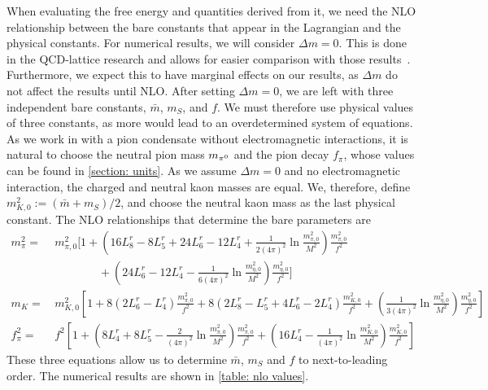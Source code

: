  When evaluating the free energy and quantities derived from it, we need the NLO relationship between the bare constants that appear in the Lagrangian and the physical constants.
For numerical results, we will consider $\Delta m = 0$.
This is done in the QCD-lattice research and allows for easier comparison with those results~\autocite{brandtNewClassCompact2018}.
Furthermore, we expect this to have marginal effects on our results, as $\Delta m$ do not affect the results until NLO.
After setting $\Delta m = 0$, we are left with three independent bare constants, $\bar m$, $m_S$, and $f$.
We must therefore use physical values of three constants, as more would lead to an overdetermined system of equations.
As we work in with a pion condensate without electromagnetic interactions, it is natural to choose the neutral pion mass $m_{\pi^0}$ and the pion decay $f_\pi$, whose values can be found in \autoref{section: units}.
As we assume $\Delta m = 0$ and no electromagnetic interaction, the charged and neutral kaon masses are equal.
We, therefore, define $m_{K,0}^2 := (\bar m + m_S)/2$, and choose the neutral kaon mass as the last physical constant.
The NLO relationships that determine the bare parameters are~\autocite{gasserChiralPerturbationTheory1985}
%
\begin{align}
    \nonumber
    m_\pi^2 
    =&\, 
    m_{\pi,0}^2
    \Bigg[
        1
        +
        \left(
            16L_8^r - 8L_5^r + 24L_6^r - 12L_4^r
            +
            \frac{1}{2(4\pi)^2}
            \ln\frac{m_{\pi,0}^2}{M^2}
        \right)\frac{m_{\pi,0}^2}{f^2}\\ 
        & \quad \quad \quad \quad
        +
        \left(
            24L_6^r - 12L_4^r
            -
            \frac{1}{6(4\pi)^2}
            \ln\frac{m_{\eta,0}^2}{M^2}
        \right)\frac{m_{\eta,0}^2}{f^2}
    \Bigg] \\
    m_{K}
    =&\,
    m_{K,0}^2
    \left[
        1
        + 8\left(2L_6^r - L_4^r\right) \frac{m_{\pi,0}^2}{f^2}
        + 8\left(2L_8^r - L_5^r + 4L_6^r- 2L_4^r\right) \frac{m_{K,0}^2}{f^2}
        +
        \left(        
            \frac{1}{3(4 \pi)^2} 
            \ln\frac{m_{\eta,0}^2}{M^2}
        \right)
        \frac{m_{\eta,0}^2}{f^2}
    \right]\\
    f_\pi^2
    =&\, f^2
    \left[
        1
        + 
        \left(
            8 L_4^r + 8 L_5^r - \frac{2}{(4\pi)^2} \ln\frac{m_{\pi,0}^2}{M^2}
        \right) \frac{m_{\pi,0}^2}{f^2}
        +
        \left(
            16 L_4^r
            - \frac{1}{(4\pi)^2} \ln\frac {m_{K,0}^2}{M^2}
        \right) \frac{m_{K,0}^2}{f^2}
    \right]
\end{align}
%
These three equations allow us to determine $\bar m$, $m_S$ and $f$ to next-to-leading order.
The numerical results are shown in \autoref{table: nlo values}.

